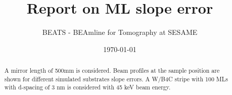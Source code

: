 \documentclass{sesamebeatsnote}
\title{Report on ML slope error}
\author{BEATS - BEAmline for Tomography at SESAME}
\date{\today}
\begin{document}
\maketitle

\begin{abstract}
A mirror length of 500mm is considered. Beam profiles at the sample position are shown for different simulated substrates slope errors. A W/B4C stripe with 100 MLs with d-spacing of 3 nm is considered with 45 keV beam energy. 
\end{abstract}

\vfill
\makereviewtable

\clearpage

\begingroup
\color{black}
\tableofcontents
\endgroup
\pagebreak

% 





% 
% 
\end{document}
